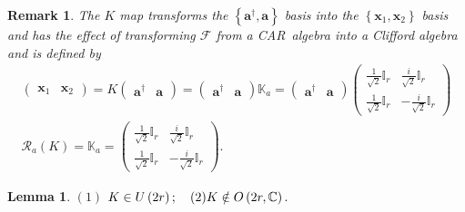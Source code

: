\documentclass[aps, preprint]{revtex4}
\newtheorem{lemma}[theorem]{Lemma}
\newtheorem{remark}[theorem]{Remark}
\begin{document}
\begin{remark}
The $K$ map transforms the $\left \{\mathbf{a}^{ \dag } ,\mathbf{a}\right \}$ basis into the $\left \{\mathbf{x}_{1} ,\mathbf{x}_{2}\right \}$ basis and has the effect of transforming $\mathcal{F}$ from a CAR\ algebra into a Clifford algebra and is defined by
\begin{gather}\left (\begin{array}{cc}\mathbf{x}_{1} & \mathbf{x}_{2}\end{array}\right ) =K \left (\begin{array}{cc}\mathbf{a}^{ \dag } & \mathbf{a}\end{array}\right ) =\left (\begin{array}{cc}\mathbf{a}^{ \dag } & \mathbf{a}\end{array}\right ) \mathbb{K}_{a} =\left (\begin{array}{cc}\mathbf{a}^{ \dag } & \mathbf{a}\end{array}\right ) \left (\begin{array}{cc}\frac{1}{\sqrt{2}} \mathbb{I}_{r} & \frac{i}{\sqrt{2}} \mathbb{I}_{r} \\
\frac{1}{\sqrt{2}} \mathbb{I}_{r} &  -\frac{i}{\sqrt{2}} \mathbb{I}_{r}\end{array}\right ) \\
\mathcal{R}_{a} \left (K\right ) =\mathbb{K}_{a} =\left (\begin{array}{cc}\frac{1}{\sqrt{2}} \mathbb{I}_{r} & \frac{i}{\sqrt{2}} \mathbb{I}_{r} \\
\frac{1}{\sqrt{2}} \mathbb{I}_{r} &  -\frac{i}{\sqrt{2}} \mathbb{I}_{r}\end{array}\right )\text{.}\end{gather}
\end{remark}


\begin{lemma}
$(1)$ $K \in U \left (2 r\right ) ;\text{\quad }(2) K \notin O \left (2 r ,\mathbb{C}\right )\text{.}$ 
\end{lemma}
\end{document}
